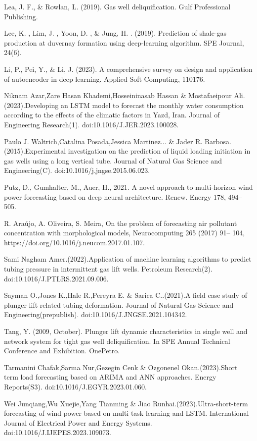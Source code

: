 \documentclass[sn-mathphys,Numbered]{sn-jnl}%
\theoremstyle{thmstyleone}%
\theoremstyle{thmstyletwo}%
\theoremstyle{thmstylethree}%
\begin{document}
Lea, J. F., \& Rowlan, L. (2019). Gas well deliquification. Gulf Professional Publishing. 

Lee, K. ,  Lim, J. ,  Yoon, D. , \&  Jung, H. . (2019). Prediction of shale-gas production at duvernay formation using deep-learning algorithm. SPE Journal, 24(6).

Li, P., Pei, Y., \& Li, J. (2023). A comprehensive survey on design and application of autoencoder in deep learning. Applied Soft Computing, 110176.

Niknam Azar,Zare Hasan Khademi,Hosseininasab Hassan \& Mostafaeipour Ali.(2023).Developing an LSTM model to forecast the monthly water consumption according to the effects of the climatic factors in Yazd, Iran. Journal of Engineering Research(1). doi:10.1016/J.JER.2023.100028. 

Paulo J. Waltrich,Catalina Posada,Jessica Martinez... \& Jader R. Barbosa.(2015).Experimental investigation on the prediction of liquid loading initiation in gas wells using a long vertical tube. Journal of Natural Gas Science and Engineering(C). doi:10.1016/j.jngse.2015.06.023.

Putz, D., Gumhalter, M., Auer, H., 2021. A novel approach to multi-horizon wind power forecasting based on deep neural architecture. Renew. Energy 178, 494–505.

R. Araújo, A. Oliveira, S. Meira, On the problem of forecasting air pollutant concentration with morphological models, Neurocomputing 265 (2017) 91– 104, https://doi.org/10.1016/j.neucom.2017.01.107.

Sami Nagham Amer.(2022).Application of machine learning algorithms to predict tubing pressure in intermittent gas lift wells. Petroleum Research(2). doi:10.1016/J.PTLRS.2021.09.006.

Sayman O.,Jones K.,Hale R.,Pereyra E. \& Sarica C..(2021).A field case study of plunger lift related tubing deformation. Journal of Natural Gas Science and Engineering(prepublish). doi:10.1016/J.JNGSE.2021.104342.

Tang, Y. (2009, October). Plunger lift dynamic characteristics in single well and network system for tight gas well deliquification. In SPE Annual Technical Conference and Exhibition. OnePetro.

Tarmanini Chafak,Sarma Nur,Gezegin Cenk \& Ozgonenel Okan.(2023).Short term load forecasting based on ARIMA and ANN approaches. Energy Reports(S3). doi:10.1016/J.EGYR.2023.01.060.

Wei Junqiang,Wu Xuejie,Yang Tianming \& Jiao Runhai.(2023).Ultra-short-term forecasting of wind power based on multi-task learning and LSTM. International Journal of Electrical Power and Energy Systems. doi:10.1016/J.IJEPES.2023.109073.
\end{document}
